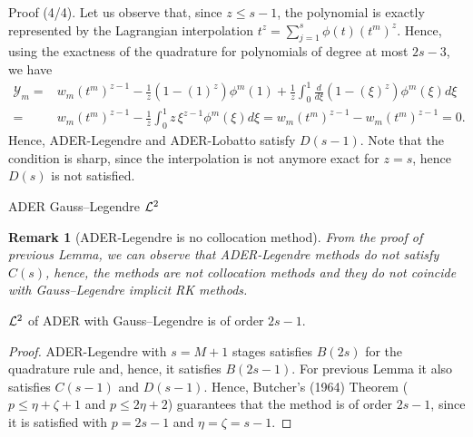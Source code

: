 \documentclass[aspectratio=169]{beamer}
\newtheorem{remark}{Remark}
\begin{document}
\begin{frame}
	\begin{block}{Proof (4/4).}
		Let us observe that, since $z\leq s-1$, the polynomial is exactly represented by the Lagrangian interpolation $t^z = \sum_{j=1}^s \phi(t) (t^m)^z$. Hence, using the exactness of the quadrature for polynomials of degree at most $2s-3$, we have
		 \begin{align*}
			 \mathcal{Y}_m=& w_m (t^m)^{z-1} - \frac1z \left(1-(1)^z\right) \phi^m(1) + \frac1z\int_0^1 \frac{d}{d\xi}\left(1-(\xi)^z\right)\phi^m(\xi) d\xi \\
			 =&  w_m (t^m)^{z-1} -   \frac1z\int_0^1 z\, \xi^{z-1}\phi^m(\xi) d\xi  =w_m (t^m)^{z-1}-w_m (t^m)^{z-1}=0 .
		 \end{align*}
		Hence, ADER-Legendre and ADER-Lobatto satisfy $D(s-1)$. Note that the condition is sharp, since the interpolation is not anymore exact for $z=s$, hence $D(s)$ is not satisfied.
	\end{block}
\end{frame}


\begin{frame}{ADER Gauss--Legendre $\mathcal{L}^2$}
	\begin{remark}[ADER-Legendre is no collocation method]
		From the proof of previous Lemma, we can observe that ADER-Legendre methods do not satisfy $C(s)$, hence, the methods are not collocation methods and they do not coincide with Gauss--Legendre implicit RK methods.
	\end{remark}
	\begin{theorem}
		$\mathcal{L}^2$ of ADER with Gauss--Legendre is of order $2s-1$.
	\end{theorem}
	\begin{proof}
		 ADER-Legendre with $s=M+1$ stages satisfies $B(2s)$ for the quadrature rule and, 
		 hence, it satisfies $B(2s-1)$. For previous Lemma it also satisfies $C(s-1)$ and $D(s-1)$. 
		 Hence, Butcher's (1964) Theorem ($p\leq \eta +\zeta +1$ and $p\leq 2\eta +2$) guarantees that the method is of order $2s-1$, 
		 since it is satisfied with $p=2s-1$ and $\eta=\zeta=s-1$.
	\end{proof}
\end{frame}
	
\end{document}
